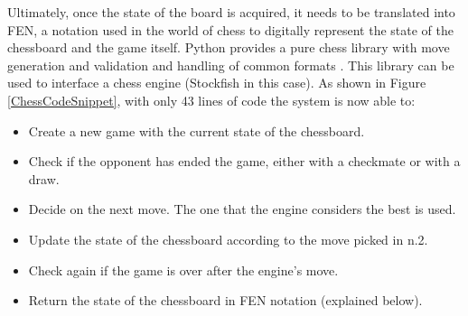 \documentclass{l4proj}
\begin{document}
Ultimately, once the state of the board is acquired, it needs to be translated into FEN, a notation used in the world of chess to digitally represent the state of the chessboard and the game itself. Python provides a pure chess library with move generation and validation and handling of common formats \cite{PythonChess}. This library can be used to interface a chess engine (Stockfish \cite{StockfishHP} in this case). As shown in Figure \ref{ChessCodeSnippet}, with only 43 lines of code the system is now able to:

\begin{itemize}

	\item Create a new game with the current state of the chessboard.
	
	\item Check if the opponent has ended the game, either with a checkmate or with a draw.
	
	\item Decide on the next move. The one that the engine considers the best is used.
	
	\item Update the state of the chessboard according to the move picked in n.2.
	
	\item Check again if the game is over after the engine's move.
	
	\item Return the state of the chessboard in FEN notation (explained below).

\end{itemize}
\end{document}
